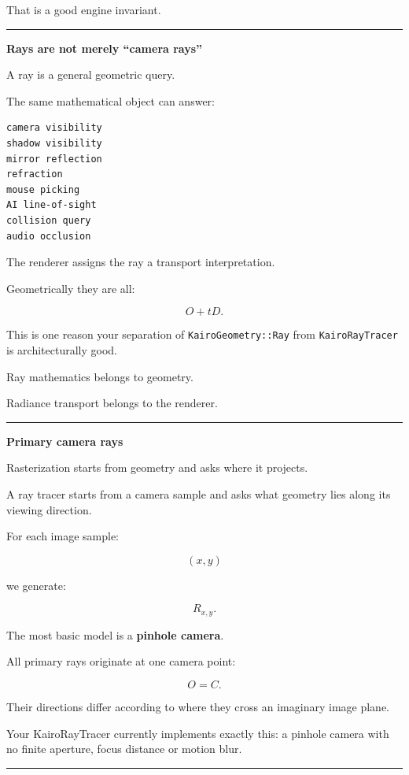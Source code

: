 That is a good engine invariant.

\begin{center}\rule{0.5\linewidth}{0.5pt}\end{center}

\textbf{Rays are not merely ``camera rays''}

A ray is a general geometric query.

The same mathematical object can answer:

\begin{verbatim}
camera visibility
shadow visibility
mirror reflection
refraction
mouse picking
AI line-of-sight
collision query
audio occlusion
\end{verbatim}

The renderer assigns the ray a transport interpretation.

Geometrically they are all:

\[
O+tD.
\]

This is one reason your separation of \texttt{KairoGeometry::Ray} from \texttt{KairoRayTracer} is architecturally good.

Ray mathematics belongs to geometry.

Radiance transport belongs to the renderer.

\begin{center}\rule{0.5\linewidth}{0.5pt}\end{center}

\textbf{Primary camera rays}

Rasterization starts from geometry and asks where it projects.

A ray tracer starts from a camera sample and asks what geometry lies along its viewing direction.

For each image sample:

\[
(x,y)
\]

we generate:

\[
R_{x,y}.
\]

The most basic model is a \textbf{pinhole camera}.

All primary rays originate at one camera point:

\[
O=C.
\]

Their directions differ according to where they cross an imaginary image plane.

Your KairoRayTracer currently implements exactly this: a pinhole camera with no finite aperture, focus distance or motion blur.

\begin{center}\rule{0.5\linewidth}{0.5pt}\end{center}

